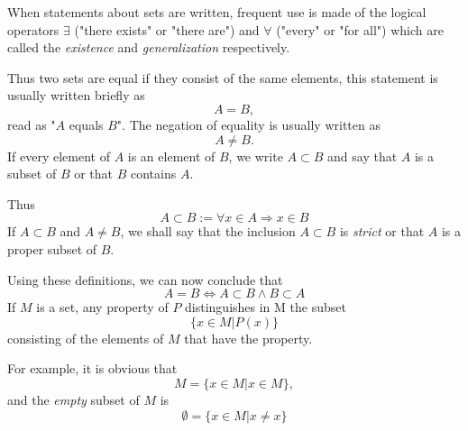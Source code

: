 \documentclass[a4paper,12pt]{article} %
\begin{document}
When statements about sets are written, frequent use is 
made of the logical operators $\exists$ ("there exists" or "there
are") and $\forall$ ("every" or "for all") which are called the
\emph{existence} and \emph{generalization} respectively.

Thus two sets are equal if they consist of the same 
elements, this statement is usually written briefly as 
\[
    A=B,
\]
read as "$A$ equals $B$". The negation of equality is usually 
written as 
\[
    A \ne B.
\]
If every element of $A$ is an element of $B$, we write
$A\subset B$ and say that $A$ is a subset of 
$B$ or that $B$ contains $A$.

Thus 
\[
    A\subset B := \forall x\in A \Rightarrow x\in B
\]
If $A\subset B$ and $A\ne B$, we shall say that the inclusion $A\subset B$ is 
\emph{strict} or that $A$ is a proper subset of $B$.

Using these definitions, we can now conclude that
\[A=B \Leftrightarrow A\subset B \wedge B\subset A\]
If $M$ is a set, any property of $P$ distinguishes in M the subset
\[\{x\in M \vert P(x)\}\]
consisting of the elements of $M$ that have the property.

For example, it is obvious that 
\[ M=\{x\in M \vert x\in M\},\]
and the \emph{empty} subset of $M$ is 
\[\emptyset = \{x\in M \vert x\ne x\}\]
\end{document}

